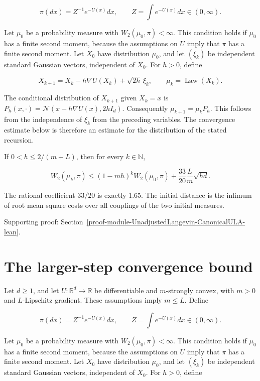 \documentclass[11pt,a4paper]{report}
\begin{document}
\[\pi(dx)=Z^{-1}e^{-U(x)}dx,\qquad Z=\int e^{-U(x)}dx\in(0,\infty).\]


Let \(\mu_0\) be a probability measure with \(W_2(\mu_0,\pi)<\infty\). This condition holds if \(\mu_0\) has a finite second moment, because the assumptions on \(U\) imply that \(\pi\) has a finite second moment. Let \(X_0\) have distribution \(\mu_0\), and let \((\xi_k)\) be independent standard Gaussian vectors, independent of \(X_0\). For \(h>0\), define


\[X_{k+1}=X_k-h\nabla U(X_k)+\sqrt{2h}\,\xi_k,\qquad\mu_k=\operatorname{Law}(X_k).\]


The conditional distribution of \(X_{k+1}\) given \(X_k=x\) is \(P_h(x,\cdot)=\mathcal N(x-h\nabla U(x),2hI_d)\). Consequently \(\mu_{k+1}=\mu_kP_h\). This follows from the independence of \(\xi_k\) from the preceding variables. The convergence estimate below is therefore an estimate for the distribution of the stated recursion.




If \(0<h\le2/(m+L)\), then for every \(k\in\mathbb N\),

\[W_2(\mu_k,\pi)\le(1-mh)^kW_2(\mu_0,\pi)+\frac{33}{20}\frac Lm\sqrt{hd}.\]

The rational coefficient \(33/20\) is exactly \(1.65\). The initial distance is the infimum of root mean square costs over all couplings of the two initial measures.


{\small\color{gray}Supporting proof: Section~\ref{proof-module-UnadjustedLangevin-CanonicalULA-lean}.\par}
\section{\texorpdfstring{The larger-step convergence bound}{The larger-step convergence bound}}


Let \(d\ge1\), and let \(U:\mathbb R^d\to\mathbb R\) be differentiable and \(m\)-strongly convex, with \(m>0\) and \(L\)-Lipschitz gradient. These assumptions imply \(m\le L\). Define


\[\pi(dx)=Z^{-1}e^{-U(x)}dx,\qquad Z=\int e^{-U(x)}dx\in(0,\infty).\]


Let \(\mu_0\) be a probability measure with \(W_2(\mu_0,\pi)<\infty\). This condition holds if \(\mu_0\) has a finite second moment, because the assumptions on \(U\) imply that \(\pi\) has a finite second moment. Let \(X_0\) have distribution \(\mu_0\), and let \((\xi_k)\) be independent standard Gaussian vectors, independent of \(X_0\). For \(h>0\), define
\end{document}
